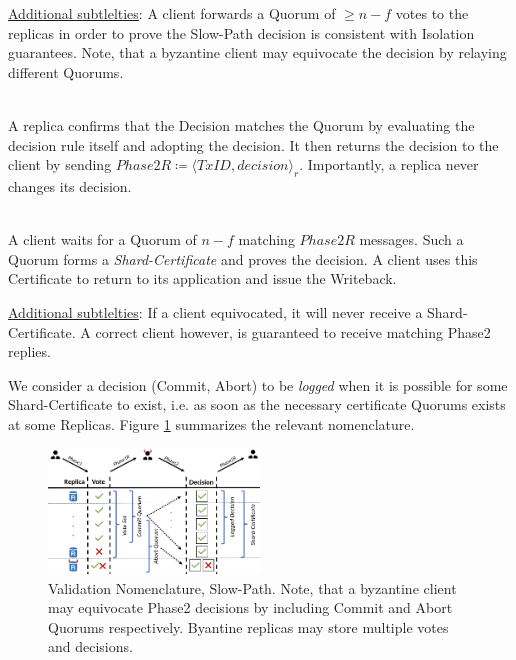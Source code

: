 \underline{Additional subtlelties}: A client forwards a Quorum of $\geq n-f$ votes to the replicas in order to prove the Slow-Path decision is consistent with Isolation guarantees. Note, that a byzantine client may equivocate the decision by relaying different Quorums.

\\
A replica confirms that the Decision matches the Quorum by evaluating the decision rule itself and adopting the decision. It then returns the decision to the client by sending $Phase2R \coloneqq \langle TxID, decision \rangle_r$. Importantly, a replica never changes its decision.

\\
A client waits for a Quorum of $n-f$ matching $Phase2R$ messages. Such a Quorum forms a \textit{Shard-Certificate} and proves the decision. A client uses this Certificate to return to its application and issue the Writeback.

\underline{Additional subtlelties}: If a client equivocated, it will never receive a Shard-Certificate. A correct client however, is guaranteed to receive matching Phase2 replies. 

We consider a decision (Commit, Abort) to be \textit{logged} when it is possible for some Shard-Certificate to exist, i.e. as soon as the necessary certificate Quorums exists at some Replicas.
Figure \ref{fig:FigureSP} summarizes the relevant nomenclature.

\begin{figure}
\begin{center}
\includegraphics[width= 0.5\textwidth]{./figures/Nom2.png}
\end{center}
\caption{Validation Nomenclature, Slow-Path. Note, that a byzantine client may equivocate Phase2 decisions by including Commit and Abort Quorums respectively. Byantine replicas may store multiple votes and decisions.}
\label{fig:FigureSP}
\end{figure}

